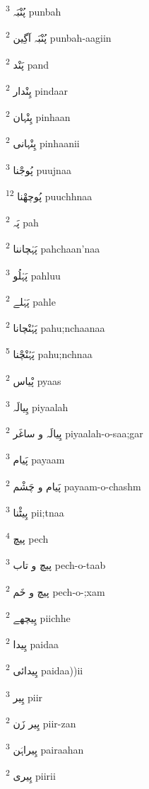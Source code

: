 \documentclass[12pt]{article}
\begin{document}
\begin{multicols}{5}
{\ur پُنْبَہ}   \textsuperscript{3} punbah

{\ur پُنْبَہ آگِین}   \textsuperscript{2} punbah-aagiin

{\ur پَنْد}   \textsuperscript{2} pand

{\ur پِنْدار}   \textsuperscript{2} pindaar

{\ur پِنْہان}   \textsuperscript{2} pinhaan

{\ur پِنْہانی}   \textsuperscript{2} pinhaanii

{\ur پُوجْنا}   \textsuperscript{3} puujnaa

{\ur پُوچھْنا}   \textsuperscript{12} puuchhnaa

{\ur پَہ}   \textsuperscript{2} pah

{\ur پَہْچاننا}   \textsuperscript{2} pahchaan'naa

{\ur پَہْلُو}   \textsuperscript{3} pahluu

{\ur پَہْلے}   \textsuperscript{2} pahle

{\ur پَہُنْچانا}   \textsuperscript{2} pahu;nchaanaa

{\ur پَہُنْچْنا}   \textsuperscript{5} pahu;nchnaa

{\ur پْیاس}   \textsuperscript{2} pyaas

{\ur پِیالَہ}   \textsuperscript{3} piyaalah

{\ur پِیالَہ و ساغَر}   \textsuperscript{2} piyaalah-o-saa;gar

{\ur پَیام}   \textsuperscript{3} payaam

{\ur پَیام و چَشْم}   \textsuperscript{2} payaam-o-chashm

{\ur پِیٹْنا}   \textsuperscript{3} pii;tnaa

{\ur پیچ}   \textsuperscript{4} pech

{\ur پیچ و تاب}   \textsuperscript{3} pech-o-taab

{\ur پیچ و خَم}   \textsuperscript{2} pech-o-;xam

{\ur پِیچھے}   \textsuperscript{2} piichhe

{\ur پِیدا}   \textsuperscript{2} paidaa

{\ur پِیدائی}   \textsuperscript{2} paidaa))ii

{\ur پِیر}   \textsuperscript{3} piir

{\ur پِیر زَن}   \textsuperscript{2} piir-zan

{\ur پِیراہَن}   \textsuperscript{3} pairaahan

{\ur پِیری}   \textsuperscript{2} piirii


\end{multicols}
\end{document}
